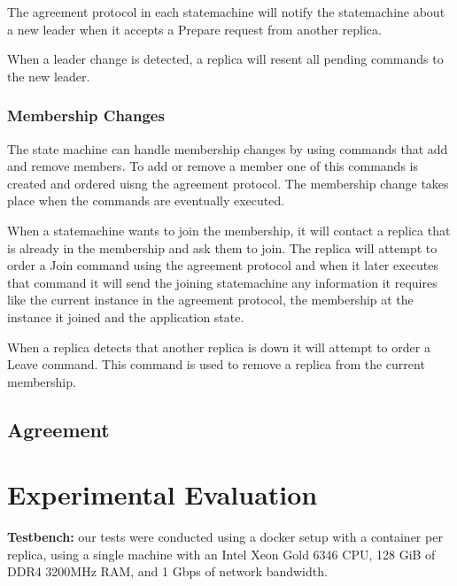 \documentclass[sigconf]{acmart}
\begin{document}
The agreement protocol in each statemachine will notify the statemachine about a new leader
when it accepts a Prepare request from another replica.

When a leader change is detected, a replica will resent all pending commands to the new leader.


\subsubsection{Membership Changes}


The state machine can handle membership changes by using commands that add and remove members.
To add or remove a member one of this commands is created and ordered uisng the agreement protocol.
The membership change takes place when the commands are eventually executed.

When a statemachine wants to join the membership, it will contact a replica that is already in the membership and ask them to join.
The replica will attempt to order a Join command using the agreement protocol and when it later executes that command it will send
the joining statemachine any information it requires like the current instance in the agreement protocol, the membership at the instance
it joined and the application state.

When a replica detects that another replica is down it will attempt to order a Leave command.
This command is used to remove a replica from the current membership.

\subsection{Agreement}


\section{Experimental Evaluation}

\textbf{Testbench:} our tests were conducted using a docker setup with a container per replica, using a single machine with an Intel Xeon Gold 6346 CPU, 128 GiB of DDR4 3200MHz RAM, and 1 Gbps of network bandwidth. 
\end{document}

